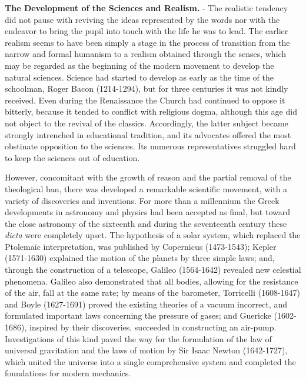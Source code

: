 \documentclass[]{book}
\begin{document}
\textbf{The Development of the Sciences and Realism.} - The realistic tendency did not pause with reviving the ideas represented by the words nor with the endeavor to bring the pupil into touch with the life he was to lead. The earlier realism seems to have been simply a stage in the process of transition from the narrow and formal humanism to a realism obtained through the senses, which may be regarded as the beginning of the modern movement to develop the natural sciences. Science had started to develop as early as the time of the schoolman, Roger Bacon (1214-1294), but for three centuries it was not kindly received. Even during the Renaissance the Church had continued to oppose it bitterly, because it tended to conflict with religious dogma, although this age did not object to the revival of the classics. Accordingly, the latter subject became strongly intrenched in educational tradition, and its advocates offered the most obstinate opposition to the sciences. Its numerous representatives struggled hard to keep the sciences out of education.

However, concomitant with the growth of reason and the partial removal of the theological ban, there was developed a remarkable scientific movement, with a variety of discoveries and inventions. For more than a millennium the Greek developments in astronomy and physics had been accepted as final, but toward the close astronomy of the sixteenth and during the seventeenth century these \emph{dicta} were completely upset. The hypothesis of a solar system, which replaced the Ptolemaic interpretation, was published by Copernicus (1473-1543); Kepler (1571-1630) explained the motion of the planets by three simple laws; and, through the construction of a telescope, Galileo (1564-1642) revealed new celestial phenomena. Galileo also demonstrated that all bodies, allowing for the resistance of the air, fall at the same rate; by means of the barometer, Torricelli (1608-1647) and Boyle (1627-1691) proved the existing theories of a vacuum incorrect, and formulated important laws concerning the pressure of gases; and Guericke (1602-1686), inspired by their discoveries, succeeded in constructing an air-pump. Investigations of this kind paved the way for the formulation of the law of universal gravitation and the laws of motion by Sir Isaac Newton (1642-1727), which united the universe into a single comprehensive system and completed the foundations for modern mechanics.
\end{document}
